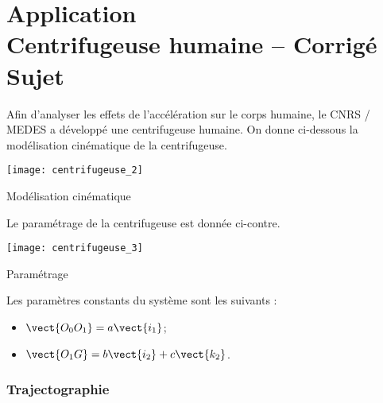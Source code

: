 
\chapter*{Application  \\ 
Centrifugeuse humaine -- \ifprof Corrigé \else Sujet \fi}

\iflivret {} \else
\ifprof  {} \else \fi
\fi

\setcounter{question}{0}
\marginnote[1cm]{
}






Afin d'analyser les effets de l'accélération sur le corps humaine, le CNRS / MEDES a développé une centrifugeuse humaine. On donne ci-dessous la modélisation cinématique de la centrifugeuse.

\begin{marginfigure}
\texttt{[image: centrifugeuse\_2]}
\caption{Modélisation cinématique}
\end{marginfigure}


Le paramétrage de la centrifugeuse est donnée ci-contre.



\begin{marginfigure}
\texttt{[image: centrifugeuse\_3]}
\caption{Paramétrage}
\end{marginfigure}

Les paramètres constants du système sont les suivants : 
\begin{itemize}%
\item $\vect{O_0O_1} = a \vect{i_1}$;
\item $\vect{O_1G} = b \vect{i_2} + c \vect{k_2}$.
\end{itemize}


\subsection*{Trajectographie}


